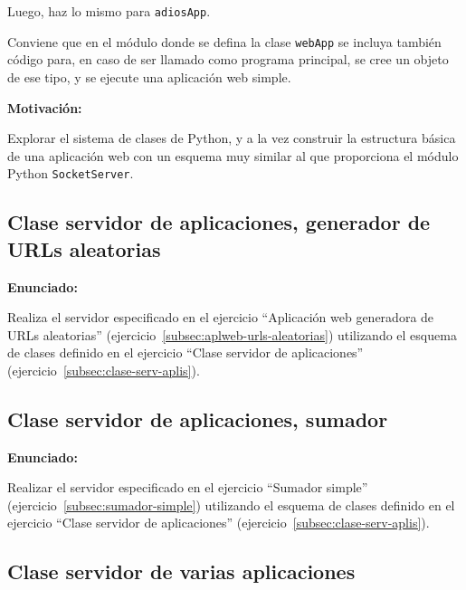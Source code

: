 Luego, haz lo mismo para \texttt{adiosApp}.

Conviene que en el módulo donde se defina la clase \texttt{webApp} se incluya también código para, en caso de ser llamado como programa principal, se cree un objeto de ese tipo, y se ejecute una aplicación web simple.

\textbf{Motivación:}

Explorar el sistema de clases de Python, y a la vez construir la estructura básica de una aplicación web con un esquema muy similar al que proporciona el módulo Python \texttt{SocketServer}.

\subsection{Clase servidor de aplicaciones, generador de URLs aleatorias}
\label{subsec:aplweb-clase-urls-aleatorias}

\textbf{Enunciado:}

Realiza el servidor especificado en el ejercicio ``Aplicación web generadora de URLs aleatorias'' (ejercicio~\ref{subsec:aplweb-urls-aleatorias}) utilizando el esquema de clases definido en el ejercicio ``Clase servidor de aplicaciones'' (ejercicio~\ref{subsec:clase-serv-aplis}).


\subsection{Clase servidor de aplicaciones, sumador}
\label{subsec:clase-sumador-simple}

\textbf{Enunciado:}

Realizar el servidor especificado en el ejercicio ``Sumador simple'' (ejercicio~\ref{subsec:sumador-simple}) utilizando el esquema de clases definido en el ejercicio ``Clase servidor de aplicaciones'' (ejercicio~\ref{subsec:clase-serv-aplis}).

\subsection{Clase servidor de varias aplicaciones}
\label{subsec:clase-serv-aplis-multi}

